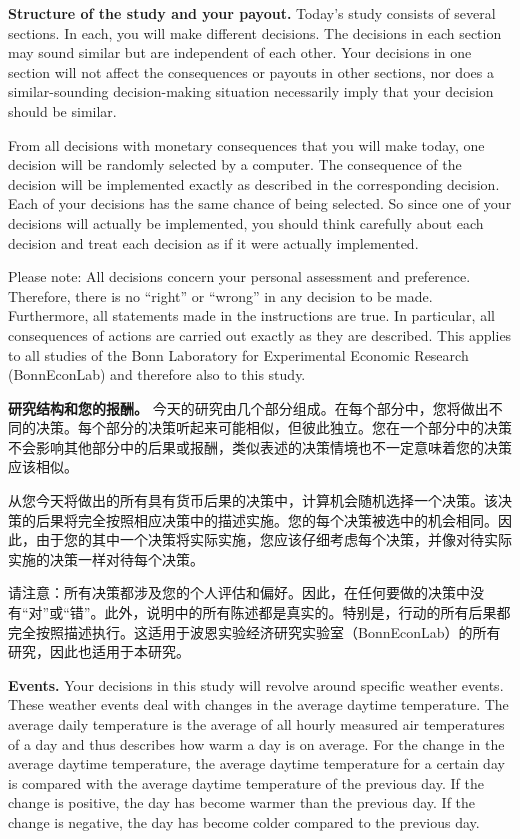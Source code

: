 \documentclass[12pt,a4paper]{article}
\newenvironment{original}
  {\par\medskip\noindent\color{black}\ignorespaces}
  {\par\medskip}
\newenvironment{translation}
  {\par\noindent\color{transblue}\ignorespaces}
  {\par\medskip\medskip}
\begin{document}
\begin{original}
\textbf{Structure of the study and your payout.} Today's study consists of several sections. In each, you will make different decisions. The decisions in each section may sound similar but are independent of each other. Your decisions in one section will not affect the consequences or payouts in other sections, nor does a similar-sounding decision-making situation necessarily imply that your decision should be similar.

From all decisions with monetary consequences that you will make today, one decision will be randomly selected by a computer. The consequence of the decision will be implemented exactly as described in the corresponding decision. Each of your decisions has the same chance of being selected. So since one of your decisions will actually be implemented, you should think carefully about each decision and treat each decision as if it were actually implemented.

Please note: All decisions concern your personal assessment and preference. Therefore, there is no ``right'' or ``wrong'' in any decision to be made. Furthermore, all statements made in the instructions are true. In particular, all consequences of actions are carried out exactly as they are described. This applies to all studies of the Bonn Laboratory for Experimental Economic Research (BonnEconLab) and therefore also to this study.
\end{original}

\begin{translation}
\textbf{研究结构和您的报酬。} 今天的研究由几个部分组成。在每个部分中，您将做出不同的决策。每个部分的决策听起来可能相似，但彼此独立。您在一个部分中的决策不会影响其他部分中的后果或报酬，类似表述的决策情境也不一定意味着您的决策应该相似。

从您今天将做出的所有具有货币后果的决策中，计算机会随机选择一个决策。该决策的后果将完全按照相应决策中的描述实施。您的每个决策被选中的机会相同。因此，由于您的其中一个决策将实际实施，您应该仔细考虑每个决策，并像对待实际实施的决策一样对待每个决策。

请注意：所有决策都涉及您的个人评估和偏好。因此，在任何要做的决策中没有``对''或``错''。此外，说明中的所有陈述都是真实的。特别是，行动的所有后果都完全按照描述执行。这适用于波恩实验经济研究实验室（BonnEconLab）的所有研究，因此也适用于本研究。
\end{translation}

\begin{original}
\textbf{Events.} Your decisions in this study will revolve around specific weather events. These weather events deal with changes in the average daytime temperature. The average daily temperature is the average of all hourly measured air temperatures of a day and thus describes how warm a day is on average. For the change in the average daytime temperature, the average daytime temperature for a certain day is compared with the average daytime temperature of the previous day. If the change is positive, the day has become warmer than the previous day. If the change is negative, the day has become colder compared to the previous day.
\end{original}
\end{document}
